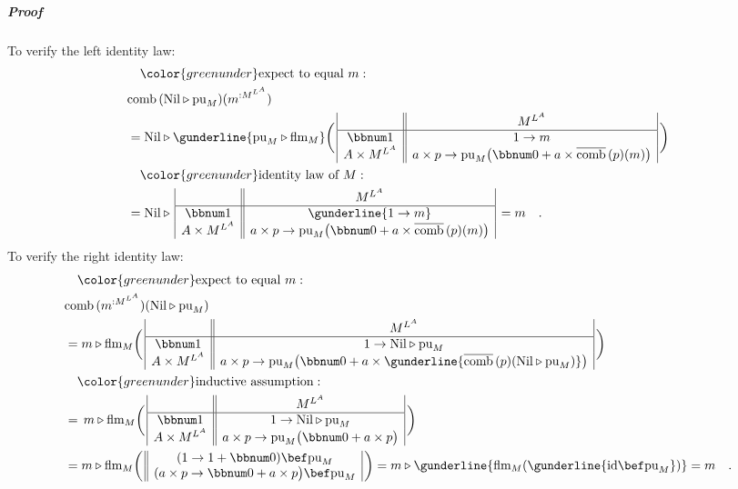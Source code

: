 \subparagraph{Proof}

To verify the left identity law:
\begin{align*}
 & \quad{\color{greenunder}\text{expect to equal }m:}\quad\\
 & \text{comb}\,(\text{Nil}\triangleright\text{pu}_{M})(m^{:M^{L^{A}}})\\
 & =\text{Nil}\triangleright\gunderline{\text{pu}_{M}\triangleright\text{flm}_{M}}\bigg(\,\begin{array}{|c||c|}
 & M^{L^{A}}\\
\hline \bbnum 1 & 1\rightarrow m\\
A\times M^{L^{A}} & a\times p\rightarrow\text{pu}_{M}\big(\bbnum 0+a\times\overline{\text{comb}}\,(p)(m)\big)
\end{array}\,\bigg)\\
 & \quad{\color{greenunder}\text{identity law of }M:}\quad\\
 & =\text{Nil}\triangleright\,\begin{array}{|c||c|}
 & M^{L^{A}}\\
\hline \bbnum 1 & \gunderline{1\rightarrow m}\\
A\times M^{L^{A}} & a\times p\rightarrow\text{pu}_{M}\big(\bbnum 0+a\times\overline{\text{comb}}\,(p)(m)\big)
\end{array}\,=m\quad.
\end{align*}
To verify the right identity law:
\begin{align*}
 & \quad{\color{greenunder}\text{expect to equal }m:}\quad\\
 & \text{comb}\,(m^{:M^{L^{A}}})(\text{Nil}\triangleright\text{pu}_{M})\\
 & =m\triangleright\text{flm}_{M}\bigg(\,\begin{array}{|c||c|}
 & M^{L^{A}}\\
\hline \bbnum 1 & 1\rightarrow\text{Nil}\triangleright\text{pu}_{M}\\
A\times M^{L^{A}} & a\times p\rightarrow\text{pu}_{M}\big(\bbnum 0+a\times\gunderline{\overline{\text{comb}}\,(p)(\text{Nil}\triangleright\text{pu}_{M})}\big)
\end{array}\,\bigg)\\
 & \quad{\color{greenunder}\text{inductive assumption}:}\quad\\
 & =\,m\triangleright\text{flm}_{M}\bigg(\,\begin{array}{|c||c|}
 & M^{L^{A}}\\
\hline \bbnum 1 & 1\rightarrow\text{Nil}\triangleright\text{pu}_{M}\\
A\times M^{L^{A}} & a\times p\rightarrow\text{pu}_{M}\big(\bbnum 0+a\times p\big)
\end{array}\,\bigg)\\
 & =m\triangleright\text{flm}_{M}\bigg(\,\begin{array}{||c|}
(1\rightarrow1+\bbnum 0)\bef\text{pu}_{M}\\
(a\times p\rightarrow\bbnum 0+a\times p\big)\bef\text{pu}_{M}
\end{array}\,\bigg)=m\triangleright\gunderline{\text{flm}_{M}(\gunderline{\text{id}\bef\text{pu}_{M}})}=m\quad.
\end{align*}
